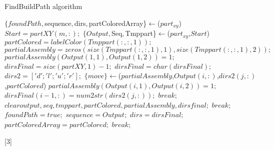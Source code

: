  
 
 \begin{algorithm}
\newcommand\algotext[3]{\end{algorithmic}#3\begin{algorithmic}[3]}
\scriptsize 
\caption{ FindBuildPath algorithm}
\begin{algorithmic}[3]
\State$\{foundPath,$sequence$, $dirs$, $partColoredArray\}$\leftarrow${}($part_{xy}$)
\newline $Start = partXY(m,:);$
\State$\{Output, $Seq$, $Tmppart\}$\leftarrow${}($part_{xy}$,$Start$)
\newline $partColored = labelColor(Tmppart(:,:,1));$
$partialAssembly = zeros(size(Tmppart(:,:,1),1),size(Tmppart(:,:,1),2));$
$partialAssembly(Output(1,1),Output(1,2)) = 1;$
\newline$dirsFinal= size(partXY,1)-1;$
\newline $dirsFinal = char(dirsFinal);$
\newline $dirs2 = ['d';'l';'u';'r'];$
\State$\{move\}\leftarrow${}($partialAssembly$,\newline$Output(i,:)$,$dirs2(j,:)$,$partColored$)
$partialAssembly(Output(i,1),Output(i,2)) = 1;$
$dirsFinal(i-1,:) = num2str(dirs2(j,:));$
\newline $break;$
\EndIf
\EndFor
{}
\newline$clear output, seq, tmppart, partColored, partialAssembly, dirsfinal;$
$break;$
\EndIf
{}
\newline$foundPath=true; $
\EndIf
\EndFor
{}
\newline$sequence = Output;$
$dirs = dirsFinal;$
$partColoredArray = partColored;$
$break;$ 
\EndIf
\EndFor
\end{algorithmic}[3]
\end{algorithm} 
  
 
 
